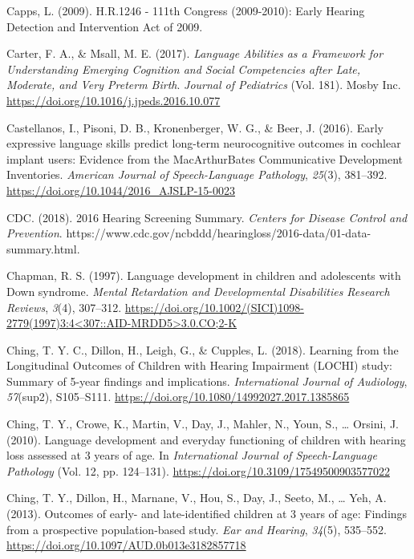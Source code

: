 \documentclass[english,man]{apa6}
\begin{document}
\leavevmode\hypertarget{ref-capps2009}{}%
Capps, L. (2009). H.R.1246 - 111th Congress (2009-2010): Early Hearing Detection and Intervention Act of 2009.

\leavevmode\hypertarget{ref-carter2017}{}%
Carter, F. A., \& Msall, M. E. (2017). \emph{Language Abilities as a Framework for Understanding Emerging Cognition and Social Competencies after Late, Moderate, and Very Preterm Birth}. \emph{Journal of Pediatrics} (Vol. 181). Mosby Inc. \url{https://doi.org/10.1016/j.jpeds.2016.10.077}

\leavevmode\hypertarget{ref-castellanos2016}{}%
Castellanos, I., Pisoni, D. B., Kronenberger, W. G., \& Beer, J. (2016). Early expressive language skills predict long-term neurocognitive outcomes in cochlear implant users: Evidence from the MacArthurBates Communicative Development Inventories. \emph{American Journal of Speech-Language Pathology}, \emph{25}(3), 381--392. \url{https://doi.org/10.1044/2016_AJSLP-15-0023}

\leavevmode\hypertarget{ref-cdc2018}{}%
CDC. (2018). 2016 Hearing Screening Summary. \emph{Centers for Disease Control and Prevention}. https://www.cdc.gov/ncbddd/hearingloss/2016-data/01-data-summary.html.

\leavevmode\hypertarget{ref-chapman1997}{}%
Chapman, R. S. (1997). Language development in children and adolescents with Down syndrome. \emph{Mental Retardation and Developmental Disabilities Research Reviews}, \emph{3}(4), 307--312. \href{https://doi.org/10.1002/(SICI)1098-2779(1997)3:4\%3C307::AID-MRDD5\%3E3.0.CO;2-K}{https://doi.org/10.1002/(SICI)1098-2779(1997)3:4\textless{}307::AID-MRDD5\textgreater{}3.0.CO;2-K}

\leavevmode\hypertarget{ref-ching2018}{}%
Ching, T. Y. C., Dillon, H., Leigh, G., \& Cupples, L. (2018). Learning from the Longitudinal Outcomes of Children with Hearing Impairment (LOCHI) study: Summary of 5-year findings and implications. \emph{International Journal of Audiology}, \emph{57}(sup2), S105--S111. \url{https://doi.org/10.1080/14992027.2017.1385865}

\leavevmode\hypertarget{ref-ching2010}{}%
Ching, T. Y., Crowe, K., Martin, V., Day, J., Mahler, N., Youn, S., \ldots{} Orsini, J. (2010). Language development and everyday functioning of children with hearing loss assessed at 3 years of age. In \emph{International Journal of Speech-Language Pathology} (Vol. 12, pp. 124--131). \url{https://doi.org/10.3109/17549500903577022}

\leavevmode\hypertarget{ref-ching2013}{}%
Ching, T. Y., Dillon, H., Marnane, V., Hou, S., Day, J., Seeto, M., \ldots{} Yeh, A. (2013). Outcomes of early- and late-identified children at 3 years of age: Findings from a prospective population-based study. \emph{Ear and Hearing}, \emph{34}(5), 535--552. \url{https://doi.org/10.1097/AUD.0b013e3182857718}
\end{document}
